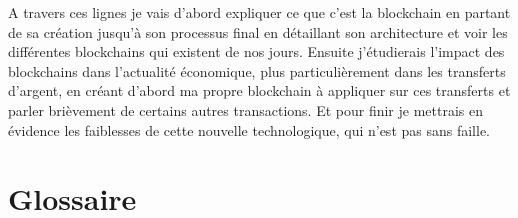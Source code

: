 \documentclass[12pt]{report}
\begin{document}
\hspace{1cm} A travers ces lignes je vais d'abord expliquer ce que c'est la blockchain en partant de sa création jusqu'à son processus final en détaillant son architecture et voir les différentes blockchains qui existent de nos jours. Ensuite j'étudierais l'impact des blockchains dans l'actualité économique, plus particulièrement dans les transferts d'argent, en créant d'abord ma propre blockchain à appliquer sur ces transferts et parler brièvement de certains autres transactions. Et pour finir je mettrais en évidence les faiblesses de cette nouvelle technologique, qui n'est pas sans faille.


\newpage
\section{Glossaire}
\end{document}
